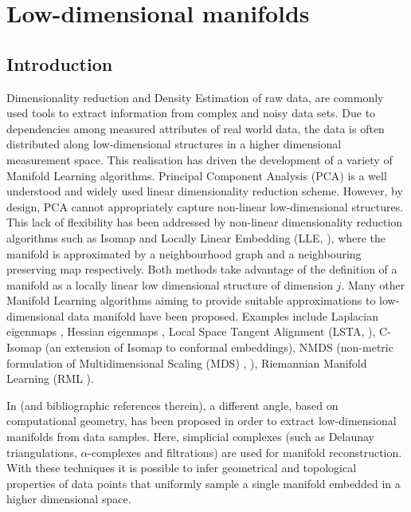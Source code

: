 \chapter{Low-dimensional manifolds}
\label{ch:manifolds}

\section{Introduction}


Dimensionality reduction and Density Estimation of raw data, are commonly used tools to extract information from complex and noisy data sets. Due to dependencies among measured attributes of real world data, the data is often distributed along low-dimensional structures in a higher dimensional measurement space. This realisation has driven the development of a variety of Manifold Learning algorithms. Principal Component Analysis (PCA) \cite{doi:10.1080/14786440109462720} is a well understood and widely used linear dimensionality reduction scheme. 
However, by design, PCA cannot appropriately capture non-linear low-dimensional structures. This lack of flexibility has been addressed by non-linear dimensionality reduction algorithms such as Isomap \cite{Tenenbaum2319} and Locally Linear Embedding (LLE, \cite{Roweis00nonlineardimensionality}), where the manifold is approximated by a neighbourhood graph and a neighbouring preserving map respectively. Both methods take advantage of the definition of a manifold as a locally linear low dimensional structure of dimension $j$.
Many other Manifold Learning algorithms aiming to provide suitable approximations to low-dimensional data manifold have been proposed. Examples include Laplacian eigenmaps \cite{Belkin01laplacianeigenmaps}, Hessian eigenmaps \cite{Donoho5591}, Local Space Tangent Alignment (LSTA, \cite{Zhang02principalmanifolds}), C-Isomap \cite{Silva:2002:GVL:2968618.2968708} (an extension of Isomap to conformal embeddings), NMDS (non-metric formulation of
Multidimensional Scaling (MDS) \cite{doi:10.1002/bs.3830040308},\cite{Cox2008}
\cite{Kruskal1964}), Riemannian Manifold Learning (RML \cite{10.1109/TPAMI.2007.70735}).

In \cite{boissonnat:hal-01615863} (and bibliographic references therein), a different angle, based on computational geometry, has been proposed in order to extract low-dimensional manifolds from data samples. Here, simplicial complexes (such as Delaunay triangulations, $\alpha$-complexes and filtrations) are used for manifold reconstruction. With these techniques it is possible to infer geometrical and topological properties of data points that uniformly sample a single manifold embedded in a higher dimensional space.

